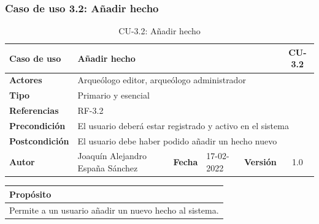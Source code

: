 \subsubsection{Caso de uso 3.2: Añadir hecho}

    \begin{table}[H]
    \begin{center}
        \begin{adjustbox}{width=\textwidth}
        \begin{tabular}{ | l | l | l | l | c | c | } 
            \hline
            \textbf{Caso de uso} & \multicolumn{4}{l|}{Añadir hecho} & \cellcolor{gray!50} \textbf{CU-3.2}\\
            \hline
            \textbf{Actores} & \multicolumn{5}{p{0.9\linewidth}|}{Arqueólogo editor, arqueólogo administrador} \\
            \hline
            \textbf{Tipo} & \multicolumn{5}{l|}{Primario y esencial} \\
            \hline
            \textbf{Referencias} & \multicolumn{3}{l|}{RF-3.2} & \multicolumn{2}{l|}{ }\\
            \hline
            \textbf{Precondición} & \multicolumn{5}{l|}{El usuario deberá estar registrado y activo en el sistema} \\
            \hline
            \textbf{Postcondición} & \multicolumn{5}{l|}{El usuario debe haber podido añadir un hecho nuevo} \\
            \hline
            \textbf{Autor} & \multicolumn{1}{p{0.25\linewidth}|}{Joaquín Alejandro España Sánchez} & \textbf{Fecha} & 
            17-02-2022     & \textbf{Versión}                                                      & 1.0\\
            \hline
        \end{tabular}
        \end{adjustbox}
        \caption{CU-3.2: Añadir hecho}
        \label{tab:add-fact}
    \end{center}
    \end{table}

    \begin{table}[H]
        \centering
        \begin{tabularx}{\textwidth}{@{} |L |@{}} \hline
            \textbf{Propósito} \\
            \hline
            Permite a un usuario añadir un nuevo hecho al sistema. \\
            \hline
        \end{tabularx}
    \end{table}

